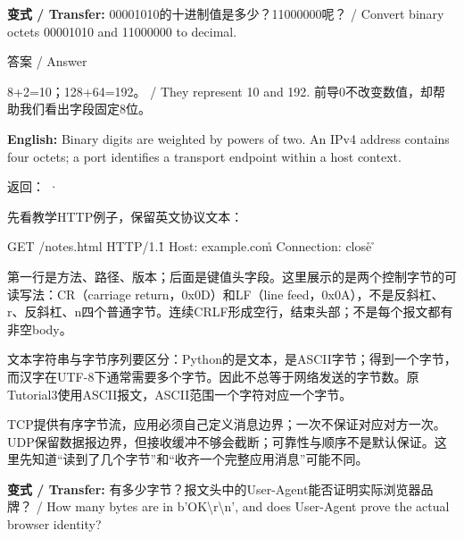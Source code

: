 \textbf{变式 / Transfer:} 00001010的十进制值是多少？11000000呢？ / Convert binary octets 00001010 and 11000000 to decimal.



\begin{StudySolution}{答案 / Answer}


8+2=10；128+64=192。 / They represent 10 and 192. 前导0不改变数值，却帮助我们看出字段固定8位。


\end{StudySolution}


\textbf{English:} Binary digits are weighted by powers of two. An IPv4 address contains four octets; a port identifies a transport endpoint within a host context.


返回： · 








先看教学HTTP例子，保留英文协议文本：



\begin{StudyCode}
GET /notes.html HTTP/1.1\r\n
Host: example.com\r\n
Connection: close\r\n
\r\n
\end{StudyCode}


第一行是方法、路径、版本；后面是键值头字段。这里展示的是两个控制字节的可读写法：CR（carriage return，0x0D）和LF（line feed，0x0A），不是反斜杠、r、反斜杠、n四个普通字节。连续CRLF形成空行，结束头部；不是每个报文都有非空body。


文本字符串与字节序列要区分：Python的是文本，是ASCII字节；得到一个字节，而汉字在UTF-8下通常需要多个字节。因此不总等于网络发送的字节数。原Tutorial3使用ASCII报文，ASCII范围一个字符对应一个字节。


TCP提供有序字节流，应用必须自己定义消息边界；一次不保证对应对方一次。UDP保留数据报边界，但接收缓冲不够会截断；可靠性与顺序不是默认保证。这里先知道“读到了几个字节”和“收齐一个完整应用消息”可能不同。


\textbf{变式 / Transfer:} 有多少字节？报文头中的User-Agent能否证明实际浏览器品牌？ / How many bytes are in b'OK\textbackslash{}r\textbackslash{}n', and does User-Agent prove the actual browser identity?



